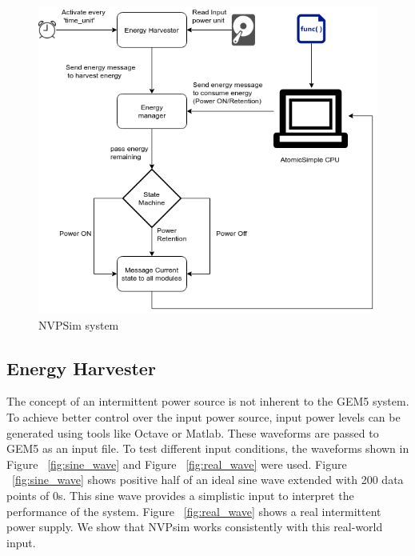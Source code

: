 \documentclass[conference]{IEEEtran}
\begin{document}
\begin{figure}[htbp]
\centerline{\includegraphics[scale=0.4]{nvpsim.png}}
\caption{NVPSim system}
\label{fig:nvpsim}
\end{figure}

\subsection{Energy Harvester}
The concept of an intermittent power source is not inherent to the GEM5 system. To achieve better control over the input power source, input power levels can be generated using tools like Octave or Matlab. These waveforms are passed to GEM5 as an input file. To test different input conditions, the waveforms shown in Figure ~\ref{fig:sine_wave} and Figure ~\ref{fig:real_wave} were used. Figure ~\ref{fig:sine_wave} shows positive half of an ideal sine wave extended with 200 data points of 0s. This sine wave provides a simplistic input to interpret the performance of the system. Figure ~\ref{fig:real_wave} shows a real intermittent power supply. We show that NVPsim works consistently with this real-world input. 
\end{document}
